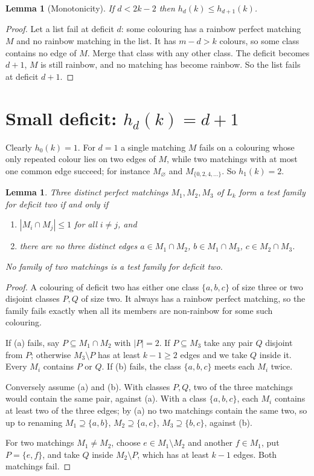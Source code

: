 \documentclass[11pt]{article}
\newtheorem{lemma}[theorem]{Lemma}
\theoremstyle{remark}
\begin{document}
\begin{lemma}[Monotonicity]\label{mono}
If \(d<2k-2\) then \(h_d(k)\le h_{d+1}(k)\).
\end{lemma}
\begin{proof}
Let a list fail at deficit \(d\): some colouring has a rainbow perfect
matching \(M\) and no rainbow matching in the list. It has
\(m-d>k\) colours, so some class contains no edge of \(M\). Merge that class
with any other class. The deficit becomes \(d+1\), \(M\) is still rainbow,
and no matching has become rainbow. So the list fails at deficit \(d+1\).
\end{proof}

\section{Small deficit: \texorpdfstring{\(h_d(k)=d+1\)}{h = d+1}}
Clearly \(h_0(k)=1\). For \(d=1\) a single matching \(M\) fails on a
colouring whose only repeated colour lies on two edges of \(M\), while two
matchings with at most one common edge succeed; for instance
\(M_\varnothing\) and \(M_{\{0,2,4,\dots\}}\). So \(h_1(k)=2\).

\begin{lemma}\label{criterion}
Three distinct perfect matchings \(M_1,M_2,M_3\) of \(L_k\) form a test
family for deficit two if and only if
\begin{enumerate}\itemsep0pt
\item[\textup{(a)}] \(|M_i\cap M_j|\le1\) for all \(i\neq j\), and
\item[\textup{(b)}] there are no three distinct edges \(a\in M_1\cap M_2\),
\(b\in M_1\cap M_3\), \(c\in M_2\cap M_3\).
\end{enumerate}
No family of two matchings is a test family for deficit two.
\end{lemma}
\begin{proof}
A colouring of deficit two has either one class \(\{a,b,c\}\) of size three
or two disjoint classes \(P,Q\) of size two. It always has a rainbow perfect
matching, so the family fails exactly when all its members are non-rainbow
for some such colouring.

If (a) fails, say \(P\subseteq M_1\cap M_2\) with \(|P|=2\). If
\(P\subseteq M_3\) take any pair \(Q\) disjoint from \(P\); otherwise
\(M_3\setminus P\) has at least \(k-1\ge2\) edges and we take \(Q\) inside
it. Every \(M_i\) contains \(P\) or \(Q\). If (b) fails, the class
\(\{a,b,c\}\) meets each \(M_i\) twice.

Conversely assume (a) and (b). With classes \(P,Q\), two of the three
matchings would contain the same pair, against (a). With a class
\(\{a,b,c\}\), each \(M_i\) contains at least two of the three edges; by (a)
no two matchings contain the same two, so up to renaming
\(M_1\supseteq\{a,b\}\), \(M_2\supseteq\{a,c\}\), \(M_3\supseteq\{b,c\}\),
against (b).

For two matchings \(M_1\ne M_2\), choose \(e\in M_1\setminus M_2\) and
another \(f\in M_1\), put \(P=\{e,f\}\), and take \(Q\) inside
\(M_2\setminus P\), which has at least \(k-1\) edges. Both matchings fail.
\end{proof}
\end{document}
